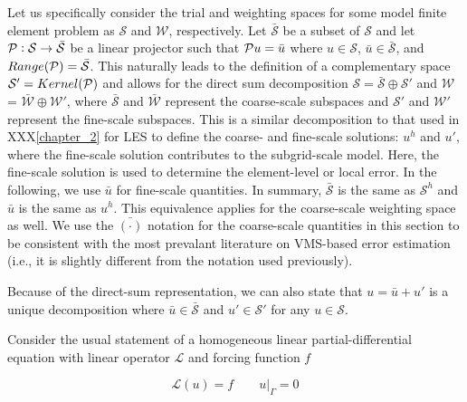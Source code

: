 Let us specifically consider the trial and weighting spaces for some model finite element problem as $\mathcal{S}$ and $\mathcal{W}$, respectively.
Let $\bar{\mathcal{S}}$ be a subset of $\mathcal{S}$ and let $\mathcal{P}: \mathcal{S} \rightarrow \bar{\mathcal{S}}$ be a linear projector such that $\mathcal{P} u = \bar{u}$ where $u \in \mathcal{S}$, $\bar{u} \in \bar{\mathcal{S}}$, and $Range(\mathcal{P})=\bar{\mathcal{S}}$.
This naturally leads to the definition of a complementary space $\mathcal{S}' = Kernel(\mathcal{P})$ and allows for the direct sum decomposition $\mathcal{S} = \bar{\mathcal{S}} \oplus \mathcal{S}'$ and $\mathcal{W}$ = $\bar{\mathcal{W}} \oplus \mathcal{W}'$, where $\bar{\mathcal{S}}$ and $\bar{\mathcal{W}}$ represent the coarse-scale subspaces and $\mathcal{S}'$ and $\mathcal{W}'$ represent the fine-scale subspaces. This is a similar decomposition to that used in XXX\ref{chapter_2} for LES to define the coarse- and fine-scale solutions: $u^h$ and $u'$, where the fine-scale solution contributes to the subgrid-scale model.
Here, the fine-scale solution is used to determine the element-level or local error. In the following, we use $\bar{u}$ for fine-scale quantities. In summary, $\bar{\mathcal{S}}$ is the same as $\mathcal{S}^h$ and $\bar{u}$ is the same as $u^h$. This equivalence applies for the coarse-scale weighting space as well. 
We use the $\bar{(\cdot)}$ notation for the coarse-scale quantities in this section to be consistent with the most prevalant literature on VMS-based error estimation (i.e., it is slightly different from the notation used previously).

Because of the direct-sum representation, we can also state that $u=\bar{u}+u'$ is a unique decomposition where $\bar{u} \in \bar{\mathcal{S}}$ and $u' \in \mathcal{S}'$ for any $u \in \mathcal{S}$.


Consider the usual statement of a homogeneous linear partial-differential equation with linear operator $\mathcal{L}$ and forcing function $f$

\begin{equation}
    \mathcal{L}(u) = f \qquad u|_{\Gamma} = 0
    \label{eq:modelProblem}
\end{equation} 

